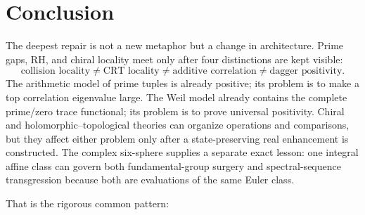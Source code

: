 \documentclass[11pt]{article}
\theoremstyle{definition}
\theoremstyle{remark}
\newcommand{\1}{\mathbf 1}
\begin{document}
\section{Conclusion}

The deepest repair is not a new metaphor but a change in architecture.  Prime gaps, RH, and chiral locality meet only after four distinctions are kept visible:
\[
\boxed{
\text{collision locality}\neq
\text{CRT locality}\neq
\text{additive correlation}\neq
\text{dagger positivity}.
}
\]
The arithmetic model of prime tuples is already positive; its problem is to make a top correlation eigenvalue large.  The Weil model already contains the complete prime/zero trace functional; its problem is to prove universal positivity.  Chiral and holomorphic--topological theories can organize operations and comparisons, but they affect either problem only after a state-preserving real enhancement is constructed.  The complex six-sphere supplies a separate exact lesson: one integral affine class can govern both fundamental-group surgery and spectral-sequence transgression because both are evaluations of the same Euler class.

That is the rigorous common pattern:
\begin{center}
\end{center}
\end{document}
